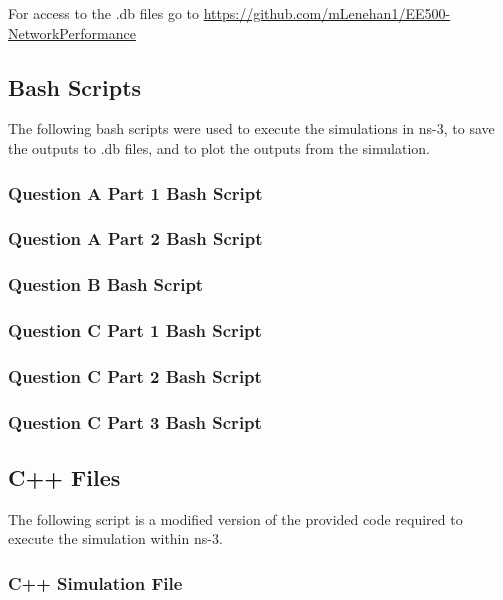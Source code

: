 For access to the .db files go to \url{https://github.com/mLenehan1/EE500-NetworkPerformance}

\subsection{Bash Scripts}
The following bash scripts were used to execute the simulations in ns-3, to save
the outputs to .db files, and to plot the outputs from the simulation.
\subsubsection{Question A Part 1 Bash Script}

\subsubsection{Question A Part 2 Bash Script}

\subsubsection{Question B Bash Script}

\subsubsection{Question C Part 1 Bash Script}

\subsubsection{Question C Part 2 Bash Script}

\subsubsection{Question C Part 3 Bash Script}


\subsection{C++ Files}
The following script is a modified version of the provided code required to
execute the simulation within ns-3.
\subsubsection{C++ Simulation File}


